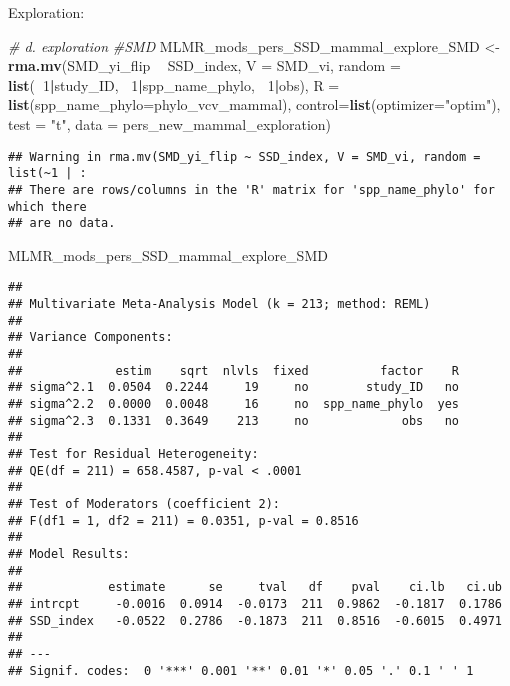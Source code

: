 \documentclass[]{article}
\newenvironment{Shaded}{\begin{snugshade}}{\end{snugshade}}
\newcommand{\KeywordTok}[1]{\textcolor[rgb]{0.13,0.29,0.53}{\textbf{#1}}}
\newcommand{\DataTypeTok}[1]{\textcolor[rgb]{0.13,0.29,0.53}{#1}}
\newcommand{\DecValTok}[1]{\textcolor[rgb]{0.00,0.00,0.81}{#1}}
\newcommand{\StringTok}[1]{\textcolor[rgb]{0.31,0.60,0.02}{#1}}
\newcommand{\CommentTok}[1]{\textcolor[rgb]{0.56,0.35,0.01}{\textit{#1}}}
\newcommand{\OperatorTok}[1]{\textcolor[rgb]{0.81,0.36,0.00}{\textbf{#1}}}
\newcommand{\NormalTok}[1]{#1}
\begin{document}
Exploration:

\begin{Shaded}
\begin{Highlighting}[]
  \CommentTok{# d. exploration}
     \CommentTok{#SMD}
\NormalTok{    MLMR_mods_pers_SSD_mammal_explore_SMD <-}\StringTok{ }\KeywordTok{rma.mv}\NormalTok{(SMD_yi_flip }\OperatorTok{~}\StringTok{ }\NormalTok{SSD_index, }\DataTypeTok{V =}\NormalTok{ SMD_vi, }
                                          \DataTypeTok{random =} \KeywordTok{list}\NormalTok{(}\OperatorTok{~}\DecValTok{1}\OperatorTok{|}\NormalTok{study_ID, }\OperatorTok{~}\DecValTok{1}\OperatorTok{|}\NormalTok{spp_name_phylo, }\OperatorTok{~}\DecValTok{1}\OperatorTok{|}\NormalTok{obs), }
                                          \DataTypeTok{R =} \KeywordTok{list}\NormalTok{(}\DataTypeTok{spp_name_phylo=}\NormalTok{phylo_vcv_mammal), }\DataTypeTok{control=}\KeywordTok{list}\NormalTok{(}\DataTypeTok{optimizer=}\StringTok{"optim"}\NormalTok{), }
                                          \DataTypeTok{test =} \StringTok{"t"}\NormalTok{, }\DataTypeTok{data =}\NormalTok{ pers_new_mammal_exploration)}
\end{Highlighting}
\end{Shaded}

\begin{verbatim}
## Warning in rma.mv(SMD_yi_flip ~ SSD_index, V = SMD_vi, random = list(~1 | :
## There are rows/columns in the 'R' matrix for 'spp_name_phylo' for which there
## are no data.
\end{verbatim}

\begin{Shaded}
\begin{Highlighting}[]
\NormalTok{    MLMR_mods_pers_SSD_mammal_explore_SMD}
\end{Highlighting}
\end{Shaded}

\begin{verbatim}
## 
## Multivariate Meta-Analysis Model (k = 213; method: REML)
## 
## Variance Components:
## 
##             estim    sqrt  nlvls  fixed          factor    R 
## sigma^2.1  0.0504  0.2244     19     no        study_ID   no 
## sigma^2.2  0.0000  0.0048     16     no  spp_name_phylo  yes 
## sigma^2.3  0.1331  0.3649    213     no             obs   no 
## 
## Test for Residual Heterogeneity:
## QE(df = 211) = 658.4587, p-val < .0001
## 
## Test of Moderators (coefficient 2):
## F(df1 = 1, df2 = 211) = 0.0351, p-val = 0.8516
## 
## Model Results:
## 
##            estimate      se     tval   df    pval    ci.lb   ci.ub 
## intrcpt     -0.0016  0.0914  -0.0173  211  0.9862  -0.1817  0.1786    
## SSD_index   -0.0522  0.2786  -0.1873  211  0.8516  -0.6015  0.4971    
## 
## ---
## Signif. codes:  0 '***' 0.001 '**' 0.01 '*' 0.05 '.' 0.1 ' ' 1
\end{verbatim}
\end{document}
